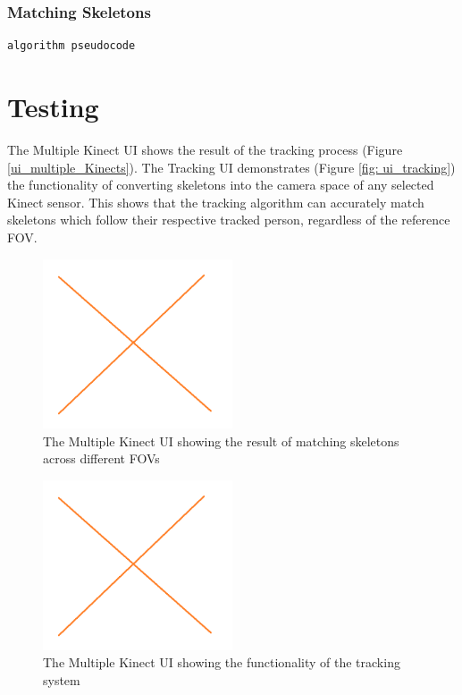 \documentclass[paper=a4, fontsize=11pt]{scrartcl}
\numberwithin{equation}{section}		%
\numberwithin{figure}{section}			%
\numberwithin{table}{section}				%
\begin{document}
\subsubsection{Matching Skeletons}

\begin{lstlisting}
algorithm pseudocode
\end{lstlisting}

\section{Testing}

The Multiple Kinect UI shows the result of the tracking process (Figure \ref{ui_multiple_Kinects}). The Tracking UI demonstrates (Figure \ref{fig: ui_tracking}) the functionality of converting skeletons into the camera space of any selected Kinect sensor. This shows that the tracking algorithm can accurately match skeletons which follow their respective tracked person, regardless of the reference FOV.


\begin{figure}[H]
	\centering
	\includegraphics[width=0.5\textwidth]{na}
	\caption{The Multiple Kinect UI showing the result of matching skeletons across different FOVs}
	\label{fig:ui_multiple_Kinects}
\end{figure}

\begin{figure}[H]
	\centering
	\includegraphics[width=0.5\textwidth]{na}
	\caption{The Multiple Kinect UI showing the functionality of the tracking system}
	\label{fig:ui_tracking}
\end{figure}
\end{document}
